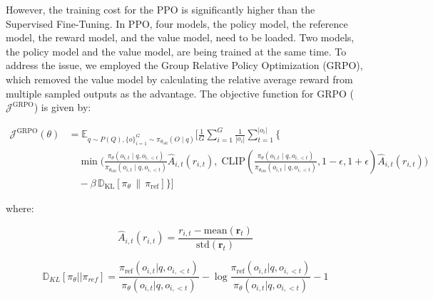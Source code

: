 However, the training cost for the PPO is significantly higher than the Supervised Fine-Tuning. In PPO, four models, the policy model, the reference model, the reward model, and the value model, need to be loaded. Two models, the policy model and the value model, are being trained at the same time. To address the issue, we employed the Group Relative Policy Optimization (GRPO), which removed the value model by calculating the relative average reward from multiple sampled outputs as the advantage. The objective function for GRPO ($\mathcal{J}^{\text{GRPO}}$) is given by:




\begin{footnotesize}
    \begin{equation}
        \begin{split}
            \mathcal{J}^{\text{GRPO}}(\theta) 
            &= \mathbb{E}_{q \sim P(Q), \{o\}^G_{i=1} \sim \pi_{\theta_{\text{old}}}(O \mid q)} \Bigg[ \frac{1}{G} \sum_{i=1}^{G} \frac{1}{|o_i|} \sum_{t=1}^{|o_i|} \Bigg\{ \nonumber \\
            &\quad \min \Bigg( 
                \frac{ \pi_{\theta}(o_{i,t} \mid q, o_{i,<t}) }{ \pi_{\theta_{\text{old}}}(o_{i,t} \mid q, o_{i,<t}) } \hat{A}_{i,t}(r_{i,t}), \;
                \text{CLIP}\left( \frac{ \pi_{\theta}(o_{i,t} \mid q, o_{i,<t}) }{ \pi_{\theta_{\text{old}}}(o_{i,t} \mid q, o_{i,<t}) }, 1 - \epsilon, 1 + \epsilon \right) \hat{A}_{i,t}(r_{i,t}) 
            \Bigg) \nonumber \\
            &\quad - \beta \, \mathbb{D}_{\text{KL}}\left[ \pi_{\theta} \,\|\, \pi_{\text{ref}} \right] 
            \Bigg\} \Bigg]
        \end{split}
    \end{equation}
\end{footnotesize}




where:

\begin{equation*}
    \hat{A}_{i,t}(r_{i, t}) = \frac{r_{i, t} - \text{mean}(\mathbf{r}_t)}{\text{std}(\mathbf{r}_t)}
\end{equation*}

\begin{equation*}
    \mathbb{D}_{KL}[\pi_{\theta} || \pi_{ref}] = \frac{\pi_{\text{ref}}(o_{i, t} | q, o_{i, <t})}{\pi_{\theta}(o_{i, t} | q, o_{i, <t})} - \log \frac{\pi_{\text{ref}}(o_{i, t} | q, o_{i, <t})}{\pi_{\theta}(o_{i, t} | q, o_{i, <t})} - 1
\end{equation*}


